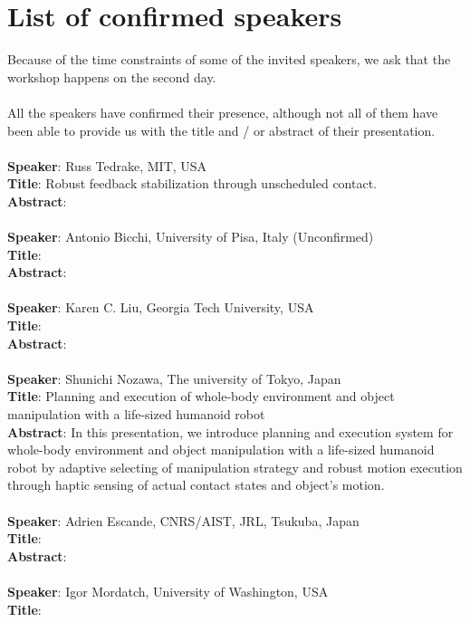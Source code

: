 \documentclass[12pt]{article}
\begin{document}
\section{List of confirmed speakers}
Because of the time constraints of some of the invited speakers, we ask that the workshop happens on the second day. \\ \\
All the speakers have confirmed their presence, although not all of them have been able to provide us with the title and / or abstract
of their presentation. \\ \\
\textbf{Speaker}: Russ Tedrake, MIT, USA \\
\textbf{Title}:  Robust feedback stabilization through unscheduled contact.\\
\textbf{Abstract}:  \\ \\
\textbf{Speaker}: Antonio Bicchi, University of Pisa, Italy (Unconfirmed)\\
\textbf{Title}: \\
\textbf{Abstract}: \\ \\
\textbf{Speaker}: Karen C. Liu, Georgia Tech University, USA \\
\textbf{Title}:  \\
\textbf{Abstract}:  \\ \\
\textbf{Speaker}: Shunichi Nozawa, The university of Tokyo, Japan \\
\textbf{Title}:  Planning and execution of whole-body environment and object
manipulation with a life-sized humanoid robot \\
\textbf{Abstract}: In this presentation, we introduce planning and execution system for whole-body environment and object manipulation with a life-sized humanoid robot by adaptive selecting of manipulation strategy and robust motion execution through haptic sensing of actual contact states and object's motion. \\ \\
\textbf{Speaker}: Adrien Escande, CNRS/AIST, JRL, Tsukuba, Japan \\
\textbf{Title}:  \\ 
\textbf{Abstract}:  \\ \\
\textbf{Speaker}: Igor Mordatch, University of Washington, USA \\
\textbf{Title}:  \\
\end{document}
